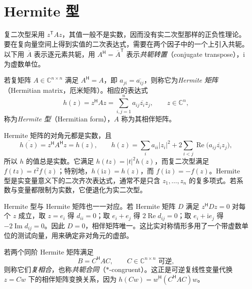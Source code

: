 \section{Hermite 型}
\label{sec:hermitian-forms}

复二次型采用 $z^{\mathsf T}Az$，其值一般不是实数，因而没有实二次型那样的正负性理论。要在复向量空间上得到实值的二次表达式，需要在两个因子中的一个上引入共轭。以下用 $\overline A$ 表示逐元素共轭，用 $A^{\mathsf H}=\overline A^{\mathsf T}$ 表示\emph{共轭转置}（conjugate transpose），$\mathrm i$ 为虚数单位。

\begin{definition}
\label{def:hermitian-form}
若复矩阵 $A\in\mathbb C^{n\times n}$ 满足 $A^{\mathsf H}=A$，即 $a_{ji}=\overline{a_{ij}}$，则称它为\emph{Hermite 矩阵}（Hermitian matrix，厄米矩阵）。相应的表达式
\begin{equation}
\label{eq:hermitian-form}
    h(z)=z^{\mathsf H}Az
       =\sum_{i,j=1}^n a_{ij}\overline{z_i}z_j,
    \qquad z\in\mathbb C^n,
\end{equation}
称为\emph{Hermite 型}（Hermitian form），$A$ 称为其相伴矩阵。
\end{definition}

Hermite 矩阵的对角元都是实数，且
\[
    \overline{h(z)}=z^{\mathsf H}A^{\mathsf H}z=h(z),
    \qquad
    h(z)=\sum_i a_{ii}|z_i|^2
          +2\sum_{i<j}\operatorname{Re}
              \bigl(a_{ij}\overline{z_i}z_j\bigr),
\]
所以 $h$ 的值总是实数。它满足 $h(tz)=|t|^2h(z)$，而复二次型满足 $f(tz)=t^2f(z)$；特别地，$h(\mathrm i z)=h(z)$，而 $f(\mathrm i z)=-f(z)$。Hermite 型是实变量意义下的二次齐次表达式，通常不是只含 $z_1,\ldots,z_n$ 的复多项式。若系数与变量都限制为实数，它便退化为实二次型。

Hermite 型与 Hermite 矩阵也一一对应。若 Hermite 矩阵 $D$ 满足 $z^{\mathsf H}Dz=0$ 对每个 $z$ 成立，取 $z=e_i$ 得 $d_{ii}=0$；取 $e_i+e_j$ 得 $2\operatorname{Re}d_{ij}=0$；取 $e_i+\mathrm i e_j$ 得 $-2\operatorname{Im}d_{ij}=0$。因此 $D=0$，相伴矩阵唯一。这比实对称情形多用了一个带虚数单位的测试向量，用来确定非对角元的虚部。

\begin{definition}
\label{def:hermitian-star-congruence}
若两个同阶 Hermite 矩阵满足
\begin{equation}
\label{eq:hermitian-congruence}
    B=C^{\mathsf H}AC,
    \qquad C\in\mathbb C^{n\times n}\text{ 可逆},
\end{equation}
则称它们\emph{复相合}，也称\emph{共轭合同}（$*$-congruent）。这正是可逆复线性变量代换 $z=Cw$ 下的相伴矩阵变换关系，因为 $h(Cw)=w^{\mathsf H}(C^{\mathsf H}AC)w$。
\end{definition}

